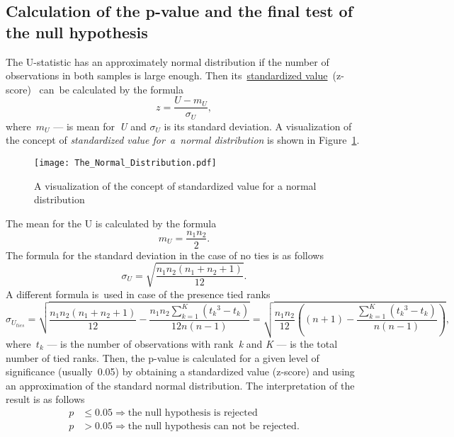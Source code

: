 \documentclass[]{scrreprt}
\begin{document}
\subsection{Calculation of the p-value and the final test of the null hypothesis}
The U-statistic has an approximately normal distribution if the number of observations in both samples is large enough. Then its~\href{https://en.wikipedia.org/wiki/Standard_score}{standardized value}~(z-score)~\cite{Wiki:z-score} can~be calculated by the formula
\begin{equation}\label{eq:z-score}
z = \frac{U-m_{U}}{\sigma_{U}},
\end{equation}
where~$m_{U}$ --- is mean for~\textit{U} and $\sigma_{U}$ is its standard deviation. A visualization of the concept of \emph{standardized value for~a~normal distribution} is shown in Figure~\ref{fig:z-score}.
%
\begin{figure}[htp]
	\centering
	\texttt{[image: The\_Normal\_Distribution.pdf]}
	\caption{A visualization of the concept of standardized value for a normal distribution \cite{Wiki:z-score}}\label{fig:z-score}
\end{figure}
%
The mean for the U is calculated by the formula
\begin{equation}\label{eq:U-mean}
m_{U} = \frac{n_{1}n_{2}}{2}.
\end{equation}
The formula for the standard deviation in the case of no ties is as follows
\begin{equation}\label{eq:standard-deviation-no-ties}
\sigma_{U} =  \sqrt{\frac{n_{1}n_{2}(n_{1}+n_{2}+1)}{12}}.
\end{equation}
A different formula is~used in case of the presence tied ranks
\begin{equation}\label{eq:standard-deviation-ties}
\sigma_{U_{ties}} = \sqrt{\frac{n_{1}n_{2}(n_{1}+n_{2}+1)}{12} - \frac{n_{1}n_{2}\sum_{k=1}^{K}({t_{k}}^{3} - t_{k})}{12n(n-1)}} = \sqrt{\frac{n_{1}n_{2}}{12} \left((n+1)-\frac{\sum_{k=1}^{K}({t_{k}}^{3} - t_{k})}{n(n-1)}\right)},
\end{equation}
where~$t_{k}$ --- is the number of observations with rank~\textit{k} and \textit{K} --- is the total number of tied ranks. Then, the p-value is calculated for a given level of significance (usually~0.05) by obtaining a standardized value (z-score) and using an approximation of the standard normal distribution. The interpretation of the result is as follows
\begin{equation}\label{eq:p-interpretation}
\begin{aligned}
p &\leq 0.05 \Rightarrow \text{the~null hypothesis is~rejected}\\
p &> 0.05 \Rightarrow \text{the~null hypothesis can~not~be rejected}.
\end{aligned}
\end{equation}
\end{document}

